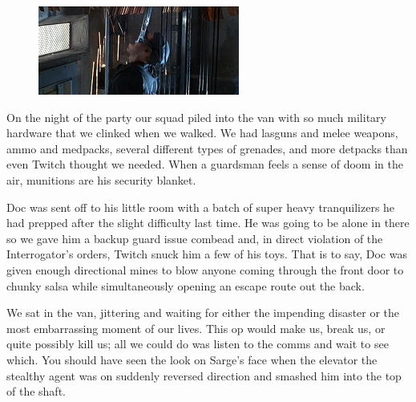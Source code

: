 \begin{figure}
	\begin{center}
		\includegraphics[width=\figwidth]{pics/5/12.png}
	\end{center}
\end{figure}
On the night of the party our squad piled into the van with so much military hardware that we clinked when we walked. 
We had lasguns and melee weapons, ammo and medpacks, several different types of grenades, and more detpacks than even Twitch thought we needed. 
When a guardsman feels a sense of doom in the air, munitions are his security blanket.

Doc was sent off to his little room with a batch of super heavy tranquilizers he had prepped after the slight difficulty last time. 
He was going to be alone in there so we gave him a backup guard issue combead and, in direct violation of the Interrogator’s orders, Twitch snuck him a few of his toys. 
That is to say, Doc was given enough directional mines to blow anyone coming through the front door to chunky salsa while simultaneously opening an escape route out the back.

We sat in the van, jittering and waiting for either the impending disaster or the most embarrassing moment of our lives. 
This op would make us, break us, or quite possibly kill us; all we could do was listen to the comms and wait to see which. 
You should have seen the look on Sarge’s face when the elevator the stealthy agent was on suddenly reversed direction and smashed him into the top of the shaft.

